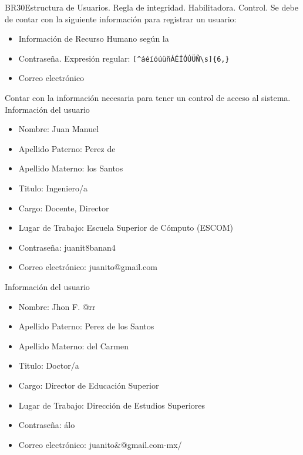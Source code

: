 \begin{BussinesRule}{BR30}{Estructura de Usuarios.}
    \BRitem[Tipo:] Regla de integridad.
    \BRitem[Clase:] Habilitadora.
    \BRitem[Nivel:] Control.
    \BRitem[Descripción:]Se debe de contar con la siguiente información para registrar un usuario:
    \begin{itemize}
        \item Información de Recurso Humano según la 
        \item Contraseña. Expresión regular: \verb|[^áéíóúüñÁÉÍÓÚÜÑ\s]{6,}|
        \item Correo electrónico
    \end{itemize}
    \BRitem[Motivación:] Contar con la información necesaria para tener un control de acceso al sistema.
     Información del usuario
    \begin{itemize}
        \item Nombre: Juan Manuel
        \item Apellido Paterno: Perez de
        \item Apellido Materno: los Santos
        \item Titulo: Ingeniero/a
        \item Cargo: Docente, Director
        \item Lugar de Trabajo: Escuela Superior de Cómputo (ESCOM)
        \item Contraseña: juanit8banan4
        \item Correo electrónico: juanito@gmail.com
    \end{itemize}
     Información del usuario
    \begin{itemize}
        \item Nombre: Jhon F. @rr
        \item Apellido Paterno: Perez de los Santos
        \item Apellido Materno: del Carmen
        \item Titulo: Doctor/a
        \item Cargo: Director de Educación Superior
        \item Lugar de Trabajo: Dirección de Estudios Superiores
        \item Contraseña: álo
        \item Correo electrónico: juanito\&@gmail.com-mx/
    \end{itemize}
 \end{BussinesRule}
